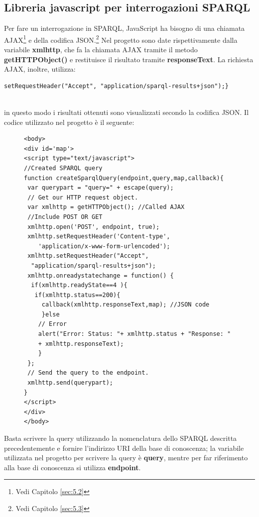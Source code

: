 \documentclass[a4paper,11pt]{article}
\begin{document}
\subsection{Libreria javascript per interrogazioni SPARQL}
\label{sec:4.2}
Per fare un interrogazione in SPARQL, JavaScript ha bisogno di una chiamata AJAX\footnote{Vedi Capitolo \ref{sec:5.2}} e della codifica JSON.\footnote{Vedi Capitolo \ref{sec:5.3}}
Nel progetto sono date rispettivamente dalla variabile \textbf{xmlhttp}, che fa la chiamata AJAX tramite il metodo \textbf{getHTTPObject()} e restituisce il risultato tramite \textbf{responseText}.
La richiesta AJAX, inoltre, utilizza: 
\begin{lstlisting}[style=htmlcssjs]
setRequestHeader("Accept", "application/sparql-results+json");} 
 
\end{lstlisting} 
in questo modo i risultati ottenuti sono visualizzati secondo la codifica JSON.
Il codice utilizzato nel progetto è il seguente:
\begin{figure}[!htb]
\begin{lstlisting}[style=htmlcssjs]
<body>		
<div id='map'>
<script type="text/javascript">
//Created SPARQL query
function createSparqlQuery(endpoint,query,map,callback){	
 var querypart = "query=" + escape(query);
 // Get our HTTP request object.
 var xmlhttp = getHTTPObject(); //Called AJAX
 //Include POST OR GET
 xmlhttp.open('POST', endpoint, true); 
 xmlhttp.setRequestHeader('Content-type',
 	'application/x-www-form-urlencoded');
 xmlhttp.setRequestHeader("Accept", 
  "application/sparql-results+json");	
 xmlhttp.onreadystatechange = function() {
  if(xmlhttp.readyState==4 ){
   if(xmlhttp.status==200){				
	 callback(xmlhttp.responseText,map); //JSON code
	 }else
	// Error
	alert("Error: Status: "+ xmlhttp.status + "Response: "
	+ xmlhttp.responseText);
	}	
 };
 // Send the query to the endpoint.
 xmlhttp.send(querypart);	
}
</script>
</div>
</body>
\end{lstlisting}
\end{figure}\newline
Basta scrivere la query utilizzando la nomenclatura dello SPARQL descritta precedentemente e fornire l'indirizzo URI della base di conoscenza; la variabile utilizzata nel progetto per scrivere la query è \textbf{query}, mentre per far riferimento alla base di conoscenza si utilizza \textbf{endpoint}.
\newpage
\end{document}
